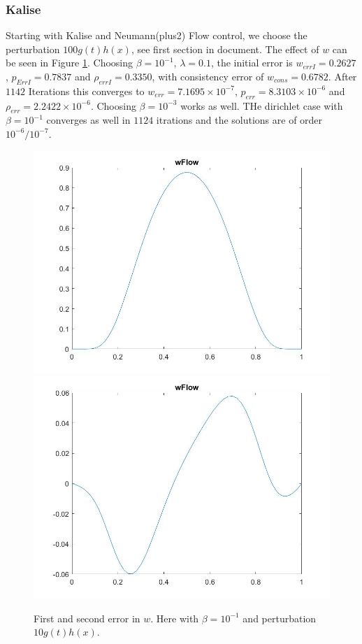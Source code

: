 \documentclass[11pt, a4paper]{article}
\theoremstyle{definition}
\begin{document}
\subsubsection*{Kalise}
Starting with Kalise and Neumann(plus2) Flow control, we choose the perturbation $100g(t)h(x)$, see first section in document. The effect of $w$ can be seen in Figure \ref{Figgh1}.
Choosing $\beta = 10^{-1}$, $\lambda=0.1$, the initial error is $w_{errI}= 0.2627$, $p_{ErrI}= 0.7837$ and $\rho_{errI}=0.3350$, with consistency error of $w_{cons}= 0.6782$. After $1142$ Iterations this converges to $w_{err} = 7.1695 \times10^{-7}$, $p_{err} = 8.3103 \times 10^{-6}$ and $\rho_{err} = 2.2422 \times 10^{-6}$. Choosing $\beta =10^{-3}$ works as well.
THe dirichlet case with $\beta = 10^{-1}$ converges as well in $1124$ itrations and the solutions are of order $10^{-6}/10^{-7}$.
\begin{figure}[h]
	\includegraphics[scale=0.3]{wPertyt1.jpg}
	\includegraphics[scale=0.3]{wPertyt2.jpg}
	\caption{First and second error in $w$. Here with $\beta =10^{-1}$ and perturbation $10g(t)h(x)$.}
	\label{Figgh1}
\end{figure}
\end{document}
